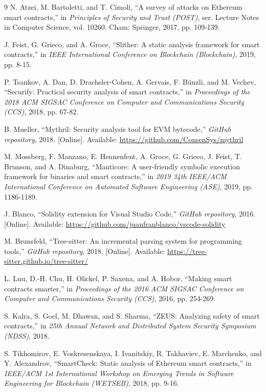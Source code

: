 \documentclass[10pt, a4paper]{article}
\begin{document}
\begin{thebibliography}{9}
 N. Atzei, M. Bartoletti, and T. Cimoli, ``A survey of attacks on Ethereum smart contracts,'' in \textit{Principles of Security and Trust (POST)}, ser. Lecture Notes in Computer Science, vol. 10260. Cham: Springer, 2017, pp. 109-139.

 J. Feist, G. Grieco, and A. Groce, ``Slither: A static analysis framework for smart contracts,'' in \textit{IEEE International Conference on Blockchain (Blockchain)}, 2019, pp. 8-15.

 P. Tsankov, A. Dan, D. Drachsler-Cohen, A. Gervais, F. Bünzli, and M. Vechev, ``Securify: Practical security analysis of smart contracts,'' in \textit{Proceedings of the 2018 ACM SIGSAC Conference on Computer and Communications Security (CCS)}, 2018, pp. 67-82.

 B. Mueller, ``Mythril: Security analysis tool for EVM bytecode,'' \textit{GitHub repository}, 2018. [Online]. Available: \url{https://github.com/ConsenSys/mythril}

 M. Mossberg, F. Manzano, E. Hennenfent, A. Groce, G. Grieco, J. Feist, T. Brunson, and A. Dinaburg, ``Manticore: A user-friendly symbolic execution framework for binaries and smart contracts,'' in \textit{2019 34th IEEE/ACM International Conference on Automated Software Engineering (ASE)}, 2019, pp. 1186-1189.

 J. Blanco, ``Solidity extension for Visual Studio Code,'' \textit{GitHub repository}, 2016. [Online]. Available: \url{https://github.com/juanfranblanco/vscode-solidity}

 M. Brunsfeld, ``Tree-sitter: An incremental parsing system for programming tools,'' \textit{GitHub repository}, 2018. [Online]. Available: \url{https://tree-sitter.github.io/tree-sitter/}

 L. Luu, D.-H. Chu, H. Olickel, P. Saxena, and A. Hobor, ``Making smart contracts smarter,'' in \textit{Proceedings of the 2016 ACM SIGSAC Conference on Computer and Communications Security (CCS)}, 2016, pp. 254-269.

 S. Kalra, S. Goel, M. Dhawan, and S. Sharma, ``ZEUS: Analyzing safety of smart contracts,'' in \textit{25th Annual Network and Distributed System Security Symposium (NDSS)}, 2018.

 S. Tikhomirov, E. Voskresenskaya, I. Ivanitskiy, R. Takhaviev, E. Marchenko, and Y. Alexandrov, ``SmartCheck: Static analysis of Ethereum smart contracts,'' in \textit{IEEE/ACM 1st International Workshop on Emerging Trends in Software Engineering for Blockchain (WETSEB)}, 2018, pp. 9-16.
\end{thebibliography}
\end{document}
